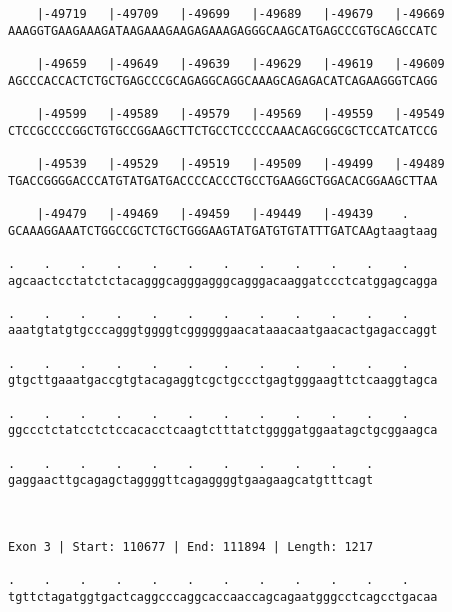 \documentclass{article}
\begin{document}
\begin{Verbatim}
    |-49719   |-49709   |-49699   |-49689   |-49679   |-49669
AAAGGTGAAGAAAGATAAGAAAGAAGAGAAAGAGGGCAAGCATGAGCCCGTGCAGCCATC
                                                            
    |-49659   |-49649   |-49639   |-49629   |-49619   |-49609
AGCCCACCACTCTGCTGAGCCCGCAGAGGCAGGCAAAGCAGAGACATCAGAAGGGTCAGG
                                                            
    |-49599   |-49589   |-49579   |-49569   |-49559   |-49549
CTCCGCCCCGGCTGTGCCGGAAGCTTCTGCCTCCCCCAAACAGCGGCGCTCCATCATCCG
                                                            
    |-49539   |-49529   |-49519   |-49509   |-49499   |-49489
TGACCGGGGACCCATGTATGATGACCCCACCCTGCCTGAAGGCTGGACACGGAAGCTTAA
                                                            
    |-49479   |-49469   |-49459   |-49449   |-49439    .    
GCAAAGGAAATCTGGCCGCTCTGCTGGGAAGTATGATGTGTATTTGATCAAgtaagtaag
                                                            
.    .    .    .    .    .    .    .    .    .    .    .    
agcaactcctatctctacagggcagggagggcagggacaaggatccctcatggagcagga
                                                            
.    .    .    .    .    .    .    .    .    .    .    .    
aaatgtatgtgcccagggtggggtcggggggaacataaacaatgaacactgagaccaggt
                                                            
.    .    .    .    .    .    .    .    .    .    .    .    
gtgcttgaaatgaccgtgtacagaggtcgctgccctgagtgggaagttctcaaggtagca
                                                            
.    .    .    .    .    .    .    .    .    .    .    .    
ggccctctatcctctccacacctcaagtctttatctggggatggaatagctgcggaagca
                                                            
.    .    .    .    .    .    .    .    .    .    .
gaggaacttgcagagctaggggttcagaggggtgaagaagcatgtttcagt
                                                   
                                                   
 
Exon 3 | Start: 110677 | End: 111894 | Length: 1217
 
.    .    .    .    .    .    .    .    .    .    .    .    
tgttctagatggtgactcaggcccaggcaccaaccagcagaatgggcctcagcctgacaa
                                                            

\end{Verbatim}
\end{document}
